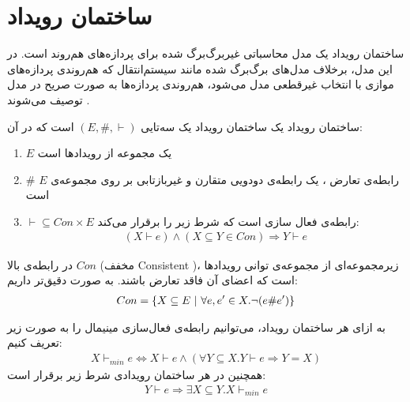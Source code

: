 \section{ساختمان رویداد}
ساختمان رویداد
\cite{es}
یک مدل محاسباتی
غیر‌برگ‌برگ شده
برای پردازه‌های هم‌روند
است.
در این مدل، برخلاف مدل‌های برگ‌برگ شده
مانند سیستم‌انتقال که هم‌روندی پردازه‌های موازی با انتخاب غیرقطعی مدل می‌شود، هم‌روندی پردازه‌ها به صورت صریح در مدل توصیف می‌شوند
\cite{sassone1996models}.
\begin{definition}{ساختمان رویداد}
    یک ساختمان رویداد یک سه‌تایی
    $(E,\#,\vdash)$
    است که در آن:
    \begin{enumerate}
        \item $E$
              یک مجموعه از رویداد‌ها است
        \item $\#$
              رابطه‌ی تعارض
              ، یک رابطه‌ی دودویی متقارن و غیربازتابی بر روی مجموعه‌ی
              $E$
              است
        \item $\vdash \subseteq Con \times E$
              رابطه‌ی فعال سازی
              است که شرط زیر را برقرار می‌کند:
              \begin{align*}
                  (X \vdash e) \wedge (X \subseteq Y \in Con)
                  \Rightarrow Y \vdash e
              \end{align*}
    \end{enumerate}
    در رابطه‌ی بالا
    $Con$
    (مخفف 
    Consistent
    )،
    زیرمجموعه‌ای از مجموعه‌ی توانی رویدادها است که اعضای آن فاقد تعارض باشند.
    به صورت دقیق‌تر داریم:
    \begin{align*}
        Con = \{X \subseteq E ~|~ \forall e,e' \in X. \neg(e\#e')\}
    \end{align*}
\end{definition}
\begin{definition}
    به ازای هر ساختمان رویداد، می‌توانیم رابطه‌ی فعال‌سازی مینیمال را به صورت زیر تعریف کنیم:
    \begin{align*}
        X \vdash_{min} e \iff X \vdash e \wedge
        ( \forall Y \subseteq X . Y \vdash e \Rightarrow Y = X )
    \end{align*}
    همچنین در هر ساختمان رویدادی شرط زیر برقرار است:
    \begin{align*}
        Y \vdash e \Rightarrow \exists X \subseteq Y . X \vdash_{min} e
    \end{align*}
\end{definition}

